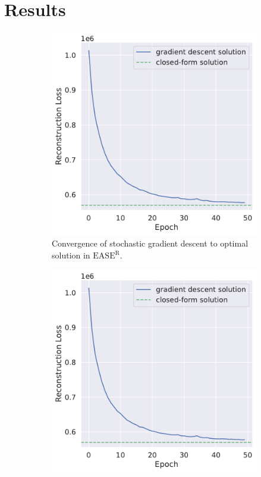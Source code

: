\documentclass{article}
\newcommand{\easer}{$\text{EASE}^\text{R}$}
\begin{document}
\section{Results}

\begin{figure}[h]
	\centering
	\begin{subfigure}[b]{0.3\textwidth}
		\centering
		\includegraphics[width=\textwidth]{figures/recon-loss.pdf}
		\caption{Convergence of stochastic gradient descent to optimal
			solution in \easer.}
		\label{fig:convergence}
	\end{subfigure}
	\begin{subfigure}[b]{0.3\textwidth}
		\centering
		\includegraphics[width=\textwidth]{figures/recon-loss.pdf}

\end{subfigure}
\end{figure}
\end{document}
